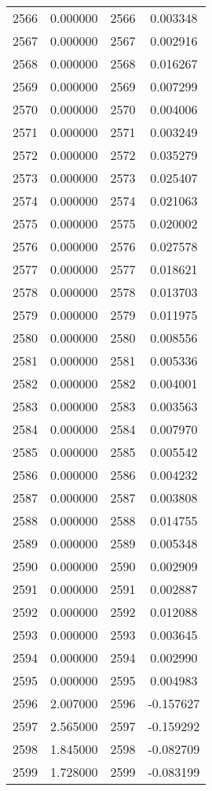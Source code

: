 \documentclass[12pt]{article}
\begin{document}
\begin{longtable}{@{}cccc@{}}
2566 & 0.000000 & 2566 & 0.003348 \\
2567 & 0.000000 & 2567 & 0.002916 \\
2568 & 0.000000 & 2568 & 0.016267 \\
2569 & 0.000000 & 2569 & 0.007299 \\
2570 & 0.000000 & 2570 & 0.004006 \\
2571 & 0.000000 & 2571 & 0.003249 \\
2572 & 0.000000 & 2572 & 0.035279 \\
2573 & 0.000000 & 2573 & 0.025407 \\
2574 & 0.000000 & 2574 & 0.021063 \\
2575 & 0.000000 & 2575 & 0.020002 \\
2576 & 0.000000 & 2576 & 0.027578 \\
2577 & 0.000000 & 2577 & 0.018621 \\
2578 & 0.000000 & 2578 & 0.013703 \\
2579 & 0.000000 & 2579 & 0.011975 \\
2580 & 0.000000 & 2580 & 0.008556 \\
2581 & 0.000000 & 2581 & 0.005336 \\
2582 & 0.000000 & 2582 & 0.004001 \\
2583 & 0.000000 & 2583 & 0.003563 \\
2584 & 0.000000 & 2584 & 0.007970 \\
2585 & 0.000000 & 2585 & 0.005542 \\
2586 & 0.000000 & 2586 & 0.004232 \\
2587 & 0.000000 & 2587 & 0.003808 \\
2588 & 0.000000 & 2588 & 0.014755 \\
2589 & 0.000000 & 2589 & 0.005348 \\
2590 & 0.000000 & 2590 & 0.002909 \\
2591 & 0.000000 & 2591 & 0.002887 \\
2592 & 0.000000 & 2592 & 0.012088 \\
2593 & 0.000000 & 2593 & 0.003645 \\
2594 & 0.000000 & 2594 & 0.002990 \\
2595 & 0.000000 & 2595 & 0.004983 \\
2596 & 2.007000 & 2596 & -0.157627 \\
2597 & 2.565000 & 2597 & -0.159292 \\
2598 & 1.845000 & 2598 & -0.082709 \\
2599 & 1.728000 & 2599 & -0.083199 \\

\end{longtable}
\end{document}
